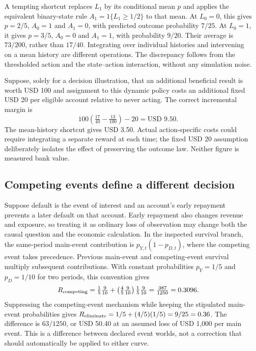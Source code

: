 A tempting shortcut replaces $L_1$ by its conditional mean $p$ and applies the equivalent binary-state rule $A_1=1\{L_1\geq1/2\}$ to that mean. At $L_0=0$, this gives $p=2/5$, $A_0=1$ and $A_1=0$, with predicted outcome probability $7/25$. At $L_0=1$, it gives $p=3/5$, $A_0=0$ and $A_1=1$, with probability $9/20$. Their average is $73/200$, rather than $17/40$. Integrating over individual histories and intervening on a mean history are different operations. The discrepancy follows from the thresholded action and the state--action interaction, without any simulation noise.

Suppose, solely for a decision illustration, that an additional beneficial result is worth USD 100 and assignment to this dynamic policy costs an additional fixed USD 20 per eligible account relative to never acting. The correct incremental margin is
\begin{equation}
 100\left(\tfrac{17}{40}-\tfrac{13}{100}\right)-20
   =\text{USD }9.50.
 \label{exec20:gformula-margin}
\end{equation}
The mean-history shortcut gives USD 3.50. Actual action-specific costs could require integrating a separate reward at each time; the fixed USD 20 assumption deliberately isolates the effect of preserving the outcome law. Neither figure is measured bank value.~\citep{exec20_gformula_reference}

\subsection{Competing events define a different decision}
\label{exec20:gformula-events}
Suppose default is the event of interest and an account's early repayment prevents a later default on that account. Early repayment also changes revenue and exposure, so treating it as ordinary loss of observation may change both the causal question and the economic calculation. In the inspected survival branch, the same-period main-event contribution is $p_{Y,t}(1-p_{D,t})$, where the competing event takes precedence. Previous main-event and competing-event survival multiply subsequent contributions. With constant probabilities $p_Y=1/5$ and $p_D=1/10$ for two periods, this convention gives
\begin{equation}
 R_{\rm competing}
 =\tfrac15\tfrac9{10}
  +\left(\tfrac45\tfrac9{10}\right)\tfrac15\tfrac9{10}
 =\tfrac{387}{1250}=0.3096.
 \label{exec20:gformula-competing}
\end{equation}
Suppressing the competing-event mechanism while keeping the stipulated main-event probabilities gives $R_{\rm eliminate}=1/5+(4/5)(1/5)=9/25=0.36$. The difference is $63/1250$, or USD 50.40 at an assumed loss of USD 1,000 per main event. This is a difference between declared event worlds, not a correction that should automatically be applied to either curve.~\citep{exec20_gformula_reuse,exec20_gformula_reference}

